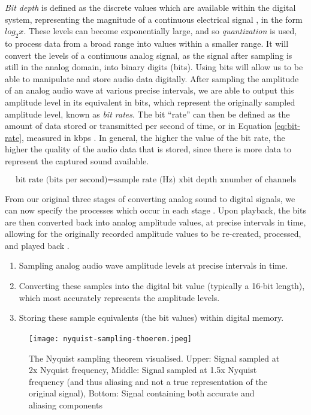 \textit{Bit depth} is defined as the discrete values which are available within the digital system, representing the magnitude of a continuous electrical signal \cite{Zjalic_2021}, in the form $log_2{x}$. These levels can become exponentially large, and so \textit{quantization} is used, to process data from a broad range into values within a smaller range. It will convert the levels of a continuous analog signal, as the signal after sampling is still in the analog domain, into binary digits (bits). Using bits will allow us to be able to manipulate and store audio data digitally. After sampling the amplitude of an analog audio wave at various precise intervals, we are able to output this amplitude level in its equivalent in bits, which represent the originally sampled amplitude level, known as \textit{bit rates}. The bit ``rate'' can then be defined as the amount of data stored or transmitted per second of time, or in Equation \ref{eq:bit-rate}, measured in kbps \cite{Zjalic_2021}. In general, the higher the value of the bit rate, the higher the quality of the audio data that is stored, since there is more data to represent the captured sound available.

\begin{equation}
	\textrm{bit rate (bits per second)} = \textrm{sample rate (Hz) x} \textrm{bit depth x} \textrm{number of channels}
	\label{eq:bit-rate}	
\end{equation}

From our original three stages of converting analog sound to digital signals, we can now specify the processes which occur in each stage \cite{Huber_Runstein_2018}. Upon playback, the bits are then converted back into analog amplitude values, at precise intervals in time, allowing for the originally recorded amplitude values to be re-created, processed, and played back \cite{Huber_Runstein_2018}. 

\begin{enumerate}
	\item Sampling analog audio wave amplitude levels at precise intervals in time.
	\item Converting these samples into the digital bit value (typically a 16-bit length), which most accurately represents the amplitude levels.
	\item Storing these sample equivalents (the bit values) within digital memory.
\end{enumerate}


\begin{figure}
  \centering
  \texttt{[image: nyquist-sampling-thoerem.jpeg]}
  \caption{The Nyquist sampling theorem visualised. Upper: Signal sampled at 2x Nyquist frequency, Middle: Signal sampled at 1.5x Nyquist frequency (and thus aliasing and not a true representation of the original signal), Bottom: Signal containing both accurate and aliasing components}\cite{Zjalic_2021}
  \label{fig:nyquist-sampling-theorem}
\end{figure}


